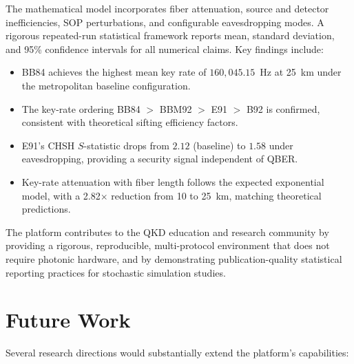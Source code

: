 \documentclass[journal]{IEEEtran}
\begin{document}
The mathematical model incorporates fiber attenuation, source and
detector inefficiencies, SOP perturbations, and configurable
eavesdropping modes. A rigorous repeated-run statistical framework
reports mean, standard deviation, and 95\% confidence intervals for
all numerical claims. Key findings include:
\begin{itemize}
  \item BB84 achieves the highest mean key rate of $160{,}045.15$~Hz
        at 25~km under the metropolitan baseline configuration.
  \item The key-rate ordering BB84 $>$ BBM92 $>$ E91 $>$ B92 is
        confirmed, consistent with theoretical sifting efficiency
        factors.
  \item E91's CHSH $S$-statistic drops from $2.12$ (baseline) to
        $1.58$ under eavesdropping, providing a security signal
        independent of QBER.
  \item Key-rate attenuation with fiber length follows the
        expected exponential model, with a 2.82$\times$ reduction
        from 10 to 25~km, matching theoretical predictions.
\end{itemize}

The platform contributes to the QKD education and research community
by providing a rigorous, reproducible, multi-protocol environment
that does not require photonic hardware, and by demonstrating
publication-quality statistical reporting practices for stochastic
simulation studies.

\section{Future Work}
\label{sec:futurework}

Several research directions would substantially extend the platform's
capabilities:
\end{document}
